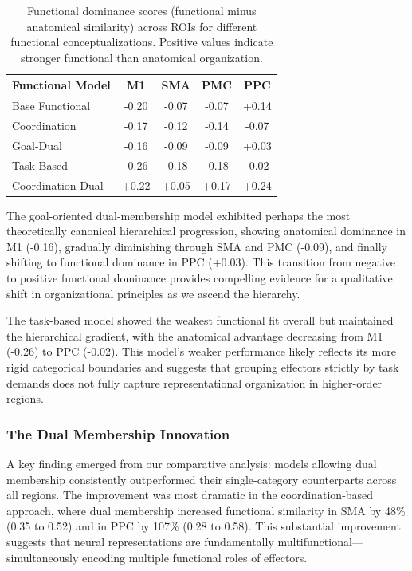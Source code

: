 \documentclass{article}
\begin{document}
\begin{table}[h]
\centering
\small
\begin{tabular}{|l|c|c|c|c|}
\hline
\textbf{Functional Model} & \textbf{M1} & \textbf{SMA} & \textbf{PMC} & \textbf{PPC} \\
\hline
Base Functional & -0.20 & -0.07 & -0.07 & +0.14 \\
Coordination & -0.17 & -0.12 & -0.14 & -0.07 \\
Goal-Dual & -0.16 & -0.09 & -0.09 & +0.03 \\
Task-Based & -0.26 & -0.18 & -0.18 & -0.02 \\
Coordination-Dual & +0.22 & +0.05 & +0.17 & +0.24 \\
\hline
\end{tabular}
\caption{Functional dominance scores (functional minus anatomical similarity) across ROIs for different functional conceptualizations. Positive values indicate stronger functional than anatomical organization.}
\label{tab:procrustes_comparison_ext}
\end{table}

The goal-oriented dual-membership model exhibited perhaps the most theoretically canonical hierarchical progression, showing anatomical dominance in M1 (-0.16), gradually diminishing through SMA and PMC (-0.09), and finally shifting to functional dominance in PPC (+0.03). This transition from negative to positive functional dominance provides compelling evidence for a qualitative shift in organizational principles as we ascend the hierarchy.

The task-based model showed the weakest functional fit overall but maintained the hierarchical gradient, with the anatomical advantage decreasing from M1 (-0.26) to PPC (-0.02). This model's weaker performance likely reflects its more rigid categorical boundaries and suggests that grouping effectors strictly by task demands does not fully capture representational organization in higher-order regions.

\subsubsection{The Dual Membership Innovation}

A key finding emerged from our comparative analysis: models allowing dual membership consistently outperformed their single-category counterparts across all regions. The improvement was most dramatic in the coordination-based approach, where dual membership increased functional similarity in SMA by 48\% (0.35 to 0.52) and in PPC by 107\% (0.28 to 0.58). This substantial improvement suggests that neural representations are fundamentally multifunctional—simultaneously encoding multiple functional roles of effectors.
\end{document}
